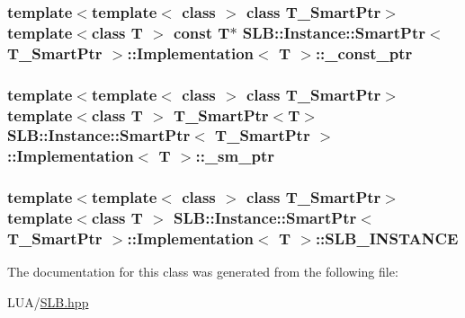 \subsubsection[{\texorpdfstring{\+\_\+const\+\_\+ptr}{_const_ptr}}]{\setlength{\rightskip}{0pt plus 5cm}template$<$template$<$ class $>$ class T\+\_\+\+Smart\+Ptr$>$ template$<$class T $>$ const T$\ast$ {\bf S\+L\+B\+::\+Instance\+::\+Smart\+Ptr}$<$ T\+\_\+\+Smart\+Ptr $>$\+::{\bf Implementation}$<$ T $>$\+::\+\_\+const\+\_\+ptr\hspace{0.3cm}{\ttfamily [protected]}}\hypertarget{classSLB_1_1Instance_1_1SmartPtr_1_1Implementation_a5dee19afc57953fdd425c112e9d912a1}{}\label{classSLB_1_1Instance_1_1SmartPtr_1_1Implementation_a5dee19afc57953fdd425c112e9d912a1}
\subsubsection[{\texorpdfstring{\+\_\+sm\+\_\+ptr}{_sm_ptr}}]{\setlength{\rightskip}{0pt plus 5cm}template$<$template$<$ class $>$ class T\+\_\+\+Smart\+Ptr$>$ template$<$class T $>$ T\+\_\+\+Smart\+Ptr$<$T$>$ {\bf S\+L\+B\+::\+Instance\+::\+Smart\+Ptr}$<$ T\+\_\+\+Smart\+Ptr $>$\+::{\bf Implementation}$<$ T $>$\+::\+\_\+sm\+\_\+ptr\hspace{0.3cm}{\ttfamily [protected]}}\hypertarget{classSLB_1_1Instance_1_1SmartPtr_1_1Implementation_a012e10d8f03a917a1693793ee1cf02ab}{}\label{classSLB_1_1Instance_1_1SmartPtr_1_1Implementation_a012e10d8f03a917a1693793ee1cf02ab}
\subsubsection[{\texorpdfstring{S\+L\+B\+\_\+\+I\+N\+S\+T\+A\+N\+CE}{SLB_INSTANCE}}]{\setlength{\rightskip}{0pt plus 5cm}template$<$template$<$ class $>$ class T\+\_\+\+Smart\+Ptr$>$ template$<$class T $>$ {\bf S\+L\+B\+::\+Instance\+::\+Smart\+Ptr}$<$ T\+\_\+\+Smart\+Ptr $>$\+::{\bf Implementation}$<$ T $>$\+::S\+L\+B\+\_\+\+I\+N\+S\+T\+A\+N\+CE\hspace{0.3cm}{\ttfamily [protected]}}\hypertarget{classSLB_1_1Instance_1_1SmartPtr_1_1Implementation_a892f2b04baac0976663d779c5be58fd5}{}\label{classSLB_1_1Instance_1_1SmartPtr_1_1Implementation_a892f2b04baac0976663d779c5be58fd5}


The documentation for this class was generated from the following file\+:\begin{DoxyCompactItemize}
\item 
L\+U\+A/\hyperlink{SLB_8hpp}{S\+L\+B.\+hpp}\end{DoxyCompactItemize}
